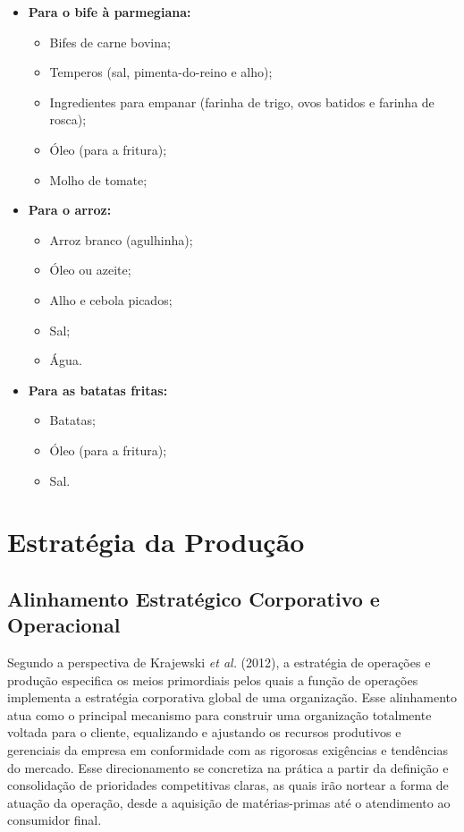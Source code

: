 \documentclass[12pt, a4paper]{article}
\begin{document}
\begin{itemize}
    \item \textbf{Para o bife à parmegiana:} 
    \begin{itemize}
        \item Bifes de carne bovina;
        \item Temperos (sal, pimenta-do-reino e alho);
        \item Ingredientes para empanar (farinha de trigo, ovos batidos e farinha de rosca);
        \item Óleo (para a fritura);
        \item Molho de tomate;
    \end{itemize}
    
    \item \textbf{Para o arroz:}
    \begin{itemize}
        \item Arroz branco (agulhinha);
        \item Óleo ou azeite;
        \item Alho e cebola picados;
        \item Sal;
        \item Água.
    \end{itemize}
    
    \item \textbf{Para as batatas fritas:}
    \begin{itemize}
        \item Batatas;
        \item Óleo (para a fritura);
        \item Sal.
    \end{itemize}
\end{itemize}


\section{Estratégia da Produção}

\subsection{Alinhamento Estratégico Corporativo e Operacional}
Segundo a perspectiva de Krajewski \textit{et al.} (2012), a estratégia de operações e produção especifica os meios primordiais pelos quais a função de operações implementa a estratégia corporativa global de uma organização. Esse alinhamento atua como o principal mecanismo para construir uma organização totalmente voltada para o cliente, equalizando e ajustando os recursos produtivos e gerenciais da empresa em conformidade com as rigorosas exigências e tendências do mercado. Esse direcionamento se concretiza na prática a partir da definição e consolidação de prioridades competitivas claras, as quais irão nortear a forma de atuação da operação, desde a aquisição de matérias-primas até o atendimento ao consumidor final.
\end{document}
